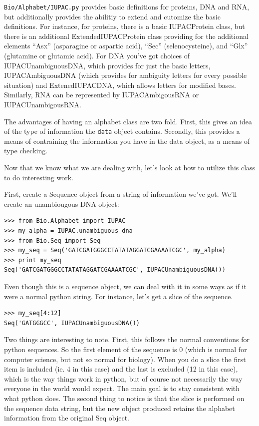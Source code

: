 \documentclass{article}
\begin{document}
\verb|Bio/Alphabet/IUPAC.py| provides basic definitions for proteins, DNA and RNA, but additionally provides the abilitiy to extend and cutomize the basic definitions. For instance, for proteins, there is a basic IUPACProtein class, but there is an additional ExtendedIUPACProtein class providing for the additional elements ``Asx'' (asparagine or aspartic acid), ``Sec'' (selenocysteine), and ``Glx'' (glutamine or glutamic acid). For DNA you've got choices of IUPACUnambiguousDNA, which provides for just the basic letters, IUPACAmbiguousDNA (which provides for ambiguity letters for every possible situation) and ExtenedIUPACDNA, which allows letters for modified bases. Similarly, RNA can be represented by IUPACAmbigousRNA or IUPACUnambigousRNA.


The advantages of having an alphabet class are two fold. First, this gives an idea of the type of information the \verb|data| object contains. Secondly, this provides a means of contraining the information you have in the data object, as a means of type checking.


Now that we know what we are dealing with, let's look at how to utilize this class to do interesting work.


First, create a Sequence object from a string of information we've got. We'll create an unambiougous DNA object:

\begin{verbatim}
>>> from Bio.Alphabet import IUPAC
>>> my_alpha = IUPAC.unambiguous_dna
>>> from Bio.Seq import Seq
>>> my_seq = Seq('GATCGATGGGCCTATATAGGATCGAAAATCGC', my_alpha)
>>> print my_seq
Seq('GATCGATGGGCCTATATAGGATCGAAAATCGC', IUPACUnambiguousDNA())
\end{verbatim}


Even though this is a sequence object, we can deal with it in some ways as if it were a normal python string. For instance, let's get a slice of the sequence.

\begin{verbatim}
>>> my_seq[4:12]
Seq('GATGGGCC', IUPACUnambiguousDNA())
\end{verbatim}

Two things are interesting to note. First, this follows the normal conventions for python sequences.  So the first element of the sequence is 0 (which is normal for computer science, but not so normal for biology). When you do a slice the first item is included (ie. 4 in this case) and the last is excluded (12 in this case), which is the way things work in python, but of course not necessarily the way everyone in the world would expect. The main goal is to stay consistent with what python does. The second thing to notice is that the slice is performed on the sequence data string, but the new object produced retains the alphabet information from the original Seq object.
\end{document}
